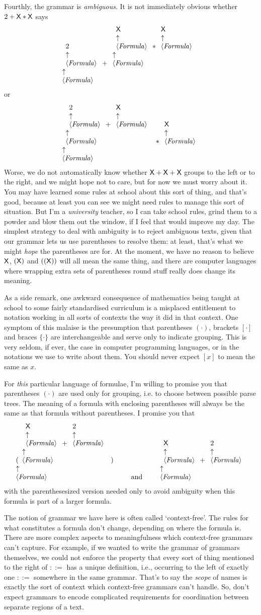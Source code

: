 \documentclass{book}
\begin{document}
Fourthly, the grammar is \emph{ambiguous}. It is not immediately obvious whether $2+\X*\X$ says
\[
\nta{Formula}{\nta{Formula}{2}+\nta{Formula}{\nta{Formula}{\X}*\nta{Formula}{\X}}}
\]
or
\[
\nta{Formula}{\nta{Formula}{\nta{Formula}{2}+\nta{Formula}{\X}}*\nta{Formula}{\X}}
\]
Worse, we do not automatically know whether $\X+\X+\X$ groups to the left or to the right, and we might hope not to care, but for now we must worry about it. You may have learned some rules at school about this sort of thing, and that's good, because at least you can see we might need rules to manage this sort of situation. But I'm a \emph{university} teacher, so I can take school rules, grind them to a powder and blow them out the window, if I feel that would improve my day.
The simplest strategy to deal with ambiguity is to reject ambiguous texts, given that our grammar lets us use parentheses to resolve them: at least, that's what we might \emph{hope} the parentheses are for. At the moment, we have no reason to believe $\X$, $(\X)$ and $((\X))$ will all mean the same thing, and there are computer languages where wrapping extra sets of parentheses round stuff really does change its meaning.

As a side remark, one awkward consequence of mathematics being taught at school to some fairly standardised curriculum is a misplaced entitlement to notation working in all sorts of contexts the way it did in that context. One symptom of this malaise is the presumption that parentheses $(\cdot)$, brackets $[\cdot]$ and braces $\{\cdot\}$ are interchangeable and serve only to indicate grouping. This is very seldom, if ever, the case in computer programming languages, or in the notations we use to write about them. You should never expect $[x]$ to mean the same as $x$.

For \emph{this} particular language of formulae, I'm willing to promise you that parentheses $(\cdot)$ are used only for grouping, i.e. to choose between possible parse trees. The meaning of a formula with enclosing parentheses will always be the same as that formula without parentheses. I promise you that
\[\nta{Formula}{(\nta{Formula}{\nta{Formula}{\X}+\nta{Formula}{2}})}
\qquad\mbox{and}\qquad
\nta{Formula}{\nta{Formula}{\X}+\nta{Formula}{2}}
\]
with the parenthesesized version needed only to avoid ambiguity when this formula is part of a larger formula.

The notion of grammar we have here is often called `context-free'. The rules for what constitutes a formula don't change, depending on where the formula is. There are more complex aspects to meaningfulness which context-free grammars can't capture. For example, if we wanted to write the grammar of grammars themselves, we could not enforce the property that every sort of thing mentioned to the right of $::=$ has a unique definition, i.e., occurring to the left of exactly one $::=$ somewhere in the same grammar. That's to say the \emph{scope} of names is exactly the sort of context which context-free grammars can't handle. So, don't expect grammars to encode complicated requirements for coordination between separate regions of a text.
\end{document}
